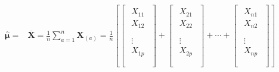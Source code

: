 \documentclass[12pt]{book}
\begin{document}
\begin{align*}
    \hat{\bm{\mu}}
    = & \overline{\mathbf{X}}
    =\frac{1}{n}\sum_{a=1}^{n}\mathbf{X}_{(a)}
    =\frac{1}{n}\left[\left[
            \begin{matrix}
                \begin{matrix}
                    X_{11} \\
                    X_{12} \\
                \end{matrix} \\
                \begin{matrix}
                    \vdots \\
                    X_{1p} \\
                \end{matrix} \\
            \end{matrix}\right]  +\left[
            \begin{matrix}
                \begin{matrix}
                    X_{21} \\
                    X_{22} \\
                \end{matrix} \\
                \begin{matrix}
                    \vdots \\
                    X_{2p} \\
                \end{matrix} \\
            \end{matrix}\right] +\cdots+ \left[
    \begin{matrix}
                \begin{matrix}
                    X_{n1} \\
                    X_{n2} \\
                \end{matrix} \\
                \begin{matrix}
                    \vdots \\
                    X_{np} \\
                \end{matrix} \\
            \end{matrix}\right]\right] \\

\end{align*}
\end{document}
